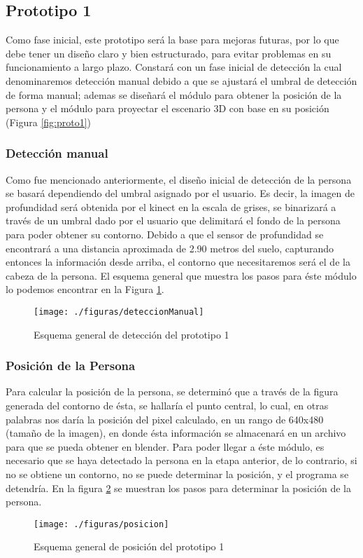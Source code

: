 \documentclass[a4paper,openright,12pt]{report}
\begin{document}
\subsection{Prototipo 1}
Como fase inicial, este prototipo será la base para mejoras futuras, por lo que debe tener un diseño claro y bien estructurado, para evitar problemas en su funcionamiento a largo plazo. Constará con un fase inicial de detección la cual denominaremos detección manual debido a que se ajustará el umbral de detección de forma manual; ademas se diseñará el módulo para obtener la posición de la persona y el módulo para proyectar el escenario 3D con base en su posición (Figura \ref{fig:proto1})

\subsubsection{Detección manual}
Como fue mencionado anteriormente, el diseño inicial de detección de la persona se basará dependiendo del umbral asignado por el usuario. Es decir, la imagen de profundidad será obtenida por el kinect en la escala de grises, se binarizará a través de un umbral dado por el usuario que delimitará el fondo de la persona para poder obtener su contorno. Debido a que el sensor de profundidad se encontrará a una distancia aproximada de 2.90 metros del suelo, capturando entonces la información desde arriba, el contorno que necesitaremos será el de la cabeza de la persona. El esquema general que muestra los pasos para éste módulo lo podemos encontrar en la Figura \ref{fig:deteccManual}.
\begin{figure}[th]
	\centering
	\texttt{[image: ./figuras/deteccionManual]}
	\caption{Esquema general de detección del prototipo 1} \label{fig:deteccManual}
\end{figure}
\subsubsection{Posición de la Persona}
Para calcular la posición de la persona, se determinó que a través de la figura generada del contorno de ésta, se hallaría el punto central, lo cual, en otras palabras nos daría la posición del pixel calculado, en un rango de 640x480 (tamaño de la imagen), en donde ésta información se almacenará en un archivo para que se pueda obtener en blender. Para poder llegar a éste módulo, es necesario que se haya detectado la persona en la etapa anterior, de lo contrario, si no se obtiene un contorno, no se puede determinar la posición, y el programa se detendría. En la figura \ref{fig:posicion} se muestran los pasos para determinar la posición de la persona.
\begin{figure}[th]
	\centering
	\texttt{[image: ./figuras/posicion]}
	\caption{Esquema general de posición del prototipo 1} \label{fig:posicion}
\end{figure}
\end{document}
